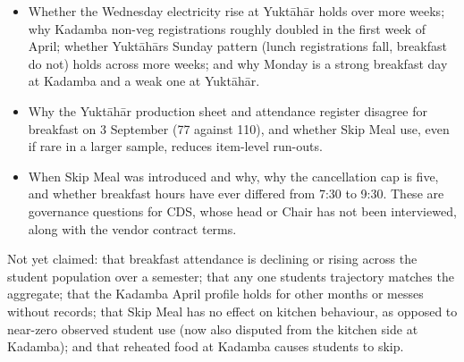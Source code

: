 \documentclass[
  10pt,
  table]{article}
\begin{document}
\begin{itemize}
\item
  Whether the Wednesday electricity rise at Yuktāhār holds over more weeks; why Kadamba non-veg registrations roughly doubled in the first week of April; whether Yuktāhār\textquotesingle s Sunday pattern (lunch registrations fall, breakfast do not) holds across more weeks; and why Monday is a strong breakfast day at Kadamba and a weak one at Yuktāhār.
\item
  Why the Yuktāhār production sheet and attendance register disagree for breakfast on 3 September (77 against 110), and whether Skip Meal use, even if rare in a larger sample, reduces item-level run-outs.
\item
  When Skip Meal was introduced and why, why the cancellation cap is five, and whether breakfast hours have ever differed from 7:30 to 9:30. These are governance questions for CDS, whose head or Chair has not been interviewed, along with the vendor contract terms.
\end{itemize}

Not yet claimed: that breakfast attendance is declining or rising across the student population over a semester; that any one student\textquotesingle s trajectory matches the aggregate; that the Kadamba April profile holds for other months or messes without records; that Skip Meal has no effect on kitchen behaviour, as opposed to near-zero observed student use (now also disputed from the kitchen side at Kadamba); and that reheated food at Kadamba causes students to skip.
\end{document}
